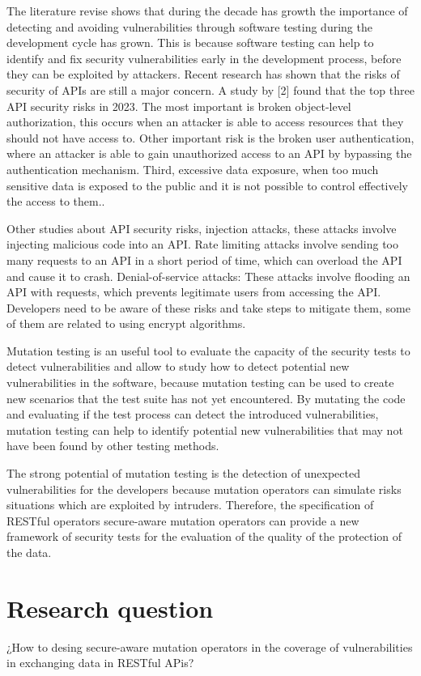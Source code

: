The literature revise shows that during the decade has growth the importance of detecting and avoiding vulnerabilities through software testing\cite{8564344} during the development cycle has grown.  This is because software testing can help to identify and fix security vulnerabilities early in the development process, before they can be exploited by attackers. Recent research has shown that the risks of security of APIs are still a major concern. A study by [2] found that the top three API security risks in 2023. The most important is broken object-level authorization, this occurs when an attacker is able to access resources that they should not have access to. Other important risk is the broken user authentication, where an attacker is able to gain unauthorized access to an API by bypassing the authentication mechanism. Third, excessive data exposure, when too much sensitive data is exposed to the public and it is not possible to control effectively the access to them..

Other studies about API security risks\cite{zenodo}, injection attacks, these attacks involve injecting malicious code into an API. Rate limiting attacks involve sending too many requests to an API in a short period of time, which can overload the API and cause it to crash. Denial-of-service attacks: These attacks involve flooding an API with requests, which prevents legitimate users from accessing the API. Developers need to be aware of these risks and take steps to mitigate them, some of them are related to using encrypt algorithms.

Mutation testing is an useful tool to evaluate the capacity of the security tests to detect vulnerabilities and allow to study how to detect potential new vulnerabilities in the software, because mutation testing can be used to create new scenarios that the test suite has not yet encountered. By mutating the code and evaluating if the test process can detect the introduced vulnerabilities, mutation testing can help to identify potential new vulnerabilities that may not have been found by other testing methods.

The strong potential of mutation testing is the detection of unexpected vulnerabilities for the developers because mutation operators can simulate risks situations which are exploited by intruders. Therefore, the specification of RESTful operators secure-aware mutation operators can provide a new framework of security tests for the evaluation of the quality of the protection of the data.

\section{Research question}

¿How to desing secure-aware mutation operators in the coverage of vulnerabilities in exchanging data in RESTful APis?
